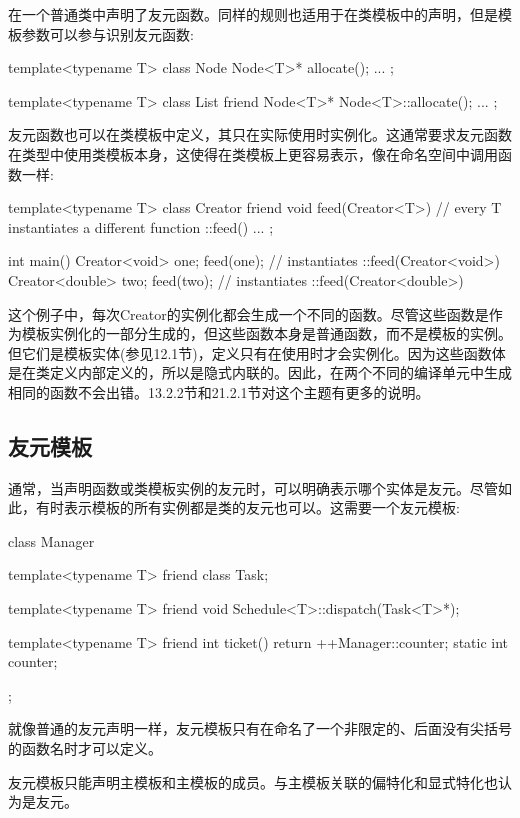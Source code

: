 在一个普通类中声明了友元函数。同样的规则也适用于在类模板中的声明，但是模板参数可以参与识别友元函数:

\begin{cpp}
template<typename T>
class Node {
	Node<T>* allocate();
	...
};

template<typename T>
class List {
	friend Node<T>* Node<T>::allocate();
	...
};
\end{cpp}

友元函数也可以在类模板中定义，其只在实际使用时实例化。这通常要求友元函数在类型中使用类模板本身，这使得在类模板上更容易表示，像在命名空间中调用函数一样:

\begin{cpp}
template<typename T>
class Creator {
	friend void feed(Creator<T>) { // every T instantiates a different function ::feed()
		...
	}
};

int main()
{
	Creator<void> one;
	feed(one); // instantiates ::feed(Creator<void>)
	Creator<double> two;
	feed(two); // instantiates ::feed(Creator<double>)
}
\end{cpp}

这个例子中，每次Creator的实例化都会生成一个不同的函数。尽管这些函数是作为模板实例化的一部分生成的，但这些函数本身是普通函数，而不是模板的实例。但它们是模板实体(参见12.1节)，定义只有在使用时才会实例化。因为这些函数体是在类定义内部定义的，所以是隐式内联的。因此，在两个不同的编译单元中生成相同的函数不会出错。13.2.2节和21.2.1节对这个主题有更多的说明。

\subsection{友元模板}

通常，当声明函数或类模板实例的友元时，可以明确表示哪个实体是友元。尽管如此，有时表示模板的所有实例都是类的友元也可以。这需要一个友元模板:

\begin{cpp}
class Manager {
	template<typename T>
	friend class Task;
	
	template<typename T>
	friend void Schedule<T>::dispatch(Task<T>*);
	
	template<typename T>
		friend int ticket() {
			return ++Manager::counter;
		}
	static int counter;
};
\end{cpp}

就像普通的友元声明一样，友元模板只有在命名了一个非限定的、后面没有尖括号的函数名时才可以定义。

友元模板只能声明主模板和主模板的成员。与主模板关联的偏特化和显式特化也认为是友元。








